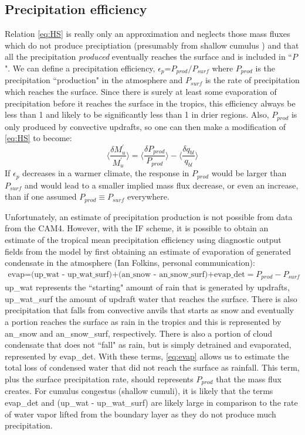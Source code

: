 \documentclass[letterpaper,12pt,titlepage,oneside,final]{book}
\begin{document}
\subsection{Precipitation efficiency}
Relation \ref{eq:HS} is really only an approximation and neglects those mass fluxes which do not produce preciptiation (presumably from shallow cumulus \citep{held_robust_2006}) and that all the precipitation \textit{produced} eventually reaches the surface and is included in ``$P$". We can define a precipitation efficiency, $\epsilon_{p}$=$P_{prod}/P_{surf}$ where $P_{prod}$ is the precipitation ``production" in the atmosphere and $P_{surf}$ is the rate of precipitation which reaches the surface. Since there is surely at least some evaporation of precipitation before it reaches the surface in the tropics, this efficiency always be less than 1 and likely to be significantly less than 1 in drier regions. Also, $P_{prod}$ is only produced by convective updrafts, so one can then make a modification of \ref{eq:HS} to become: 
\begin{equation}\label{eq:HS1}
\Bigg\langle\frac{\delta{M^{'}_{u}}}{M^{'}_{u}}\Bigg\rangle=\Bigg\langle\frac{\delta{P_{prod}}}{P_{prod}}\Bigg\rangle-\Bigg\langle\frac{\delta{q_{bl}}}{q_{bl}}\Bigg\rangle
\end{equation}
If $\epsilon_{p}$ decreases in a warmer climate, the response in $P_{prod}$ would be larger than $P_{surf}$ and would lead to a smaller implied mass flux decrease, or even an increase, than if one assumed $P_{prod}\equiv{P_{surf}}$ everywhere. 

Unfortunately, an estimate of precipitation production is not possible from data from the CAM4. However, with the IF scheme, it is possible to obtain an estimate of the tropical mean precipitation efficiency using diagnostic output fields from the model by first obtaining an estimate of evaporation of generated condensate in the atmosphere (Ian Folkins, personal communication):
\begin{align}\label{eq:evap}
\text{evap=(up\_wat - up\_wat\_surf)+(an\_snow - an\_snow\_surf)+evap\_det}=P_{prod}-P_{surf}
\end{align}
up\_wat represents the ``starting" amount of rain that is generated by updrafts, up\_wat\_surf the amount of updraft water that reaches the surface. There is also precipitation that falls from convective anvils that starts as snow and eventually a portion reaches the surface as rain in the tropics and this is represented by an\_snow and an\_snow\_surf, respectively. There is also a portion of cloud condensate that does not ``fall" as rain, but is simply detrained and evaporated, represented by evap\_det. With these terms, \ref{eq:evap} allows us to estimate the total loss of condensed water that did not reach the surface as rainfall. This term, plus the surface precipitation rate, should represents $P_{prod}$ that the mass flux creates. For cumulus congestus (shallow cumuli), it is likely that the terms evap\_det and (up\_wat - up\_wat\_surf) are likely large in comparison to the rate of water vapor lifted from the boundary layer as they do not produce much precipitation.
\end{document}
